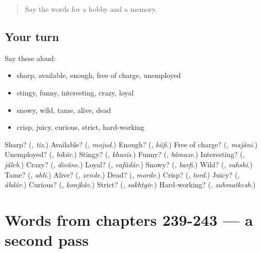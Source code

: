 \label{lesson:FA-R243-first-pass-words-from-chapters-235-238}



\begin{quote}
Say the words for a hobby and a memory.
\end{quote}

\subsection*{Your turn}
Say these aloud:

\begin{itemize}
\raggedright
  \item sharp, available, enough, free of charge, unemployed
  \item stingy, funny, interesting, crazy, loyal
  \item snowy, wild, tame, alive, dead
  \item crisp, juicy, curious, strict, hard-working
\end{itemize}

\begin{tcolorbox}[breakable,colback=teal!4,colframe=teal!35!black,title={Before you move on}]
Sharp? (\textbf{}, \emph{tiz}.) Available? (\textbf{}, \emph{mojud}.) Enough? (\textbf{}, \emph{kâfi}.) Free of charge? (\textbf{}, \emph{majâni}.) Unemployed? (\textbf{}, \emph{bikâr}.) Stingy? (\textbf{}, \emph{khasis}.) Funny? (\textbf{}, \emph{bâmaze}.) Interesting? (\textbf{}, \emph{jâleb}.) Crazy? (\textbf{}, \emph{divâne}.) Loyal? (\textbf{}, \emph{vafâdâr}.) Snowy? (\textbf{}, \emph{barfi}.) Wild? (\textbf{}, \emph{vahshi}.) Tame? (\textbf{}, \emph{ahli}.) Alive? (\textbf{}, \emph{zende}.) Dead? (\textbf{}, \emph{morde}.) Crisp? (\textbf{}, \emph{tord}.) Juicy? (\textbf{}, \emph{âbdâr}.) Curious? (\textbf{}, \emph{konjkâv}.) Strict? (\textbf{}, \emph{sakhtgir}.) Hard-working? (\textbf{}, \emph{zahmatkesh}.)
\end{tcolorbox}
\section[(dialogue)]{Words from chapters 239-243 — a second pass}

\label{lesson:FA-R243-second-pass-words-from-chapters-239-243}



